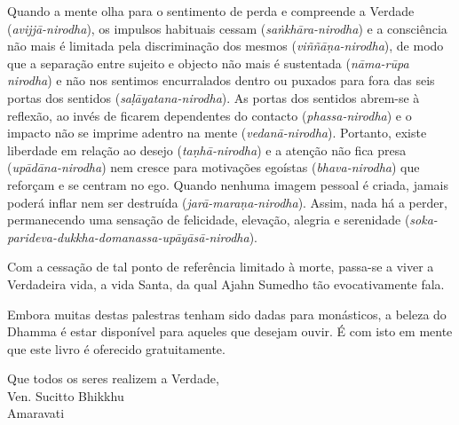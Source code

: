Quando a mente olha para o sentimento de perda e compreende a Verdade
(\emph{avijjā-nirodha}), os impulsos habituais cessam (\emph{saṅkhāra-nirodha})
e a consciência não mais é limitada pela discriminação dos mesmos
(\emph{viññāṇa-nirodha}), de modo que a separação entre sujeito e objecto não
mais é sustentada (\emph{nāma-rūpa nirodha}) e não nos sentimos encurralados
dentro ou puxados para fora das seis portas dos sentidos
(\emph{saḷāyatana-nirodha}). As portas dos sentidos abrem-se à reflexão, ao
invés de ficarem dependentes do contacto (\emph{phassa-nirodha}) e o impacto não
se imprime adentro na mente (\emph{vedanā-nirodha}). Portanto, existe liberdade
em relação ao desejo (\emph{taṇhā-nirodha}) e a atenção não fica presa
(\emph{upādāna-nirodha}) nem cresce para motivações egoístas
(\emph{bhava-nirodha}) que reforçam e se centram no ego. Quando nenhuma imagem
pessoal é criada, jamais poderá inflar nem ser destruída
(\emph{jarā-maraṇa-nirodha}). Assim, nada há a perder, permanecendo uma sensação
de felicidade, elevação, alegria e serenidade
(\emph{soka-parideva-dukkha-domanassa-upāyāsā-nirodha}).

Com a cessação de tal ponto de referência limitado à morte, passa-se a viver a
Verdadeira vida, a vida Santa, da qual Ajahn Sumedho tão evocativamente fala.

Embora muitas destas palestras tenham sido dadas para monásticos, a beleza do
Dhamma é estar disponível para aqueles que desejam ouvir. É com isto em mente
que este livro é oferecido gratuitamente.

\bigskip

{\raggedright
  Que todos os seres realizem a Verdade,\\
  Ven. Sucitto Bhikkhu\\
  Amaravati
\par}

